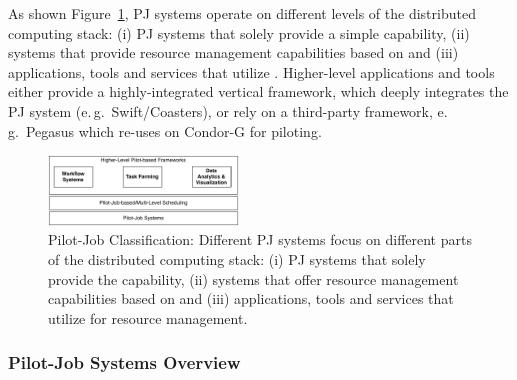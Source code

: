 \documentclass{sig-alternate}
\begin{document}
As shown Figure~\ref{fig:figures_classification}, PJ systems operate on
different levels of the distributed computing stack: (i) PJ systems that
solely provide a simple \pilot capability, (ii) systems that provide resource
management capabilities based on \pilots and (iii) applications, tools and
services that utilize \pilots. Higher-level applications and tools either 
provide a highly-integrated vertical framework, which deeply integrates the PJ 
system (e.\,g.\ Swift/Coasters), or rely on a third-party 
\pilotjob framework, e.\,g.\ Pegasus which re-uses on Condor-G for piloting.

\begin{figure}[t]
	\centering
		\includegraphics[width=0.45\textwidth]{figures/classification}
	\caption{Pilot-Job Classification: Different PJ systems focus
          on different parts of the distributed computing stack: (i)
          PJ systems that solely provide the \pilot capability, (ii)
          systems that offer resource management capabilities based on
          \pilots and (iii) applications, tools and services that
          utilize \pilots for resource management. }
	\label{fig:figures_classification}
\end{figure}


\subsubsection*{Pilot-Job Systems Overview}


\end{document}
